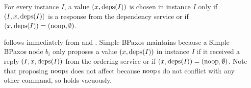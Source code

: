 \begin{invariant}
  For every instance $I$, a value $(x, \text{deps}(I))$ is chosen in instance $I$
  only if $(I, x, \text{deps}(I))$ is a response from the dependency service or if
  $(x, \text{deps}(I)) = (\text{noop}, \emptyset)$.
\end{invariant}

 follows immediately from 
and .  Simple BPaxos maintains
 because a Simple BPaxos node $b_i$ only proposes
a value $(x, \text{deps}(I))$ in instance $I$ if it received a reply $(I, x,
\text{deps}(I))$ from the ordering service or if $(x, \text{deps}(I)) = (\text{noop},
\emptyset)$. Note that proposing $\text{noop}{}$s does not affect
 because $\text{noop}$s do not conflict with any other
command, so  holds vacuously.

